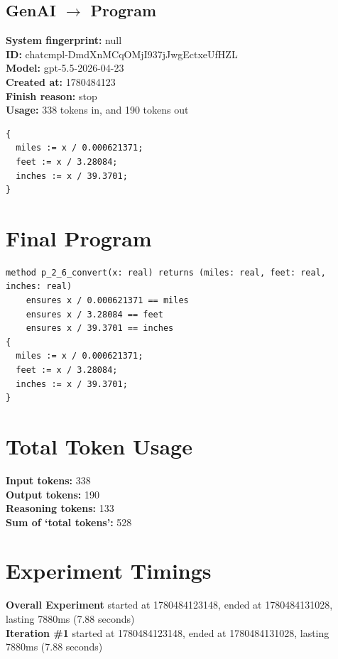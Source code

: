 \documentclass{article}
\begin{document}
\subsection*{GenAI $\rightarrow$ Program}
\textbf{System fingerprint: }null
\\\textbf{ID: }chatcmpl-DmdXnMCqOMjI937jJwgEctxeUfHZL
\\\textbf{Model: }gpt-5.5-2026-04-23
\\\textbf{Created at: }1780484123
\\\textbf{Finish reason: }stop
\\\textbf{Usage: }338 tokens in, and 190 tokens out
\begin{lstlisting}
{
  miles := x / 0.000621371;
  feet := x / 3.28084;
  inches := x / 39.3701;
}
\end{lstlisting}
\section*{Final Program}
\begin{lstlisting}
method p_2_6_convert(x: real) returns (miles: real, feet: real, inches: real)
	ensures x / 0.000621371 == miles
	ensures x / 3.28084 == feet
	ensures x / 39.3701 == inches
{
  miles := x / 0.000621371;
  feet := x / 3.28084;
  inches := x / 39.3701;
}
\end{lstlisting}
\section*{Total Token Usage}
\textbf{Input tokens: }338
\\\textbf{Output tokens: }190
\\\textbf{Reasoning tokens: }133
\\\textbf{Sum of `total tokens': }528
\section*{Experiment Timings}
\textbf{Overall Experiment} started at 1780484123148, ended at 1780484131028, lasting 7880ms (7.88 seconds)
\\\textbf{Iteration \#1} started at 1780484123148, ended at 1780484131028, lasting 7880ms (7.88 seconds)
\end{document}
